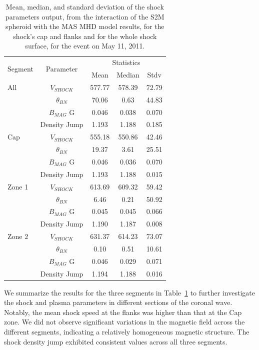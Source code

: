 \begin{table}[!htp] %
	\centering
	\caption{Mean, median, and standard deviation of the shock parameters output, from the interaction of the S2M spheroid with the MAS MHD model results, for the shock's cap and flanks and for the whole shock surface, for the event on May 11, 2011.}
	\label{T_sh_param_110511}
	\begin{tabular}{lcccc}
		\hline
		\multirow{2}{*}{Segment} & \multirow{2}{*}{Parameter} & \multicolumn{3}{c}{Statistics} \\
		&                         & Mean & Median & Stdv \\ \hline
		All & $V_{SHOCK}$ \kms    & 577.77 & 578.39 & 72.79 \\ 
		& $\theta_{BN}$ \degree   & 70.06 & 0.63 & 44.83 \\ 
		& $B_{MAG}$ G             & 0.046 & 0.038 & 0.070 \\ 
		& Density Jump            & 1.193 & 1.188 & 0.185 \\ \hline
		
		Cap & $V_{SHOCK}$ \kms    & 555.18 & 550.86 & 42.46 \\ 
		& $\theta_{BN}$ \degree   & 19.37 & 3.61 & 25.51 \\ 
		& $B_{MAG}$ G             & 0.046 & 0.036 & 0.070 \\ 
		& Density Jump            & 1.193 & 1.188 & 0.015 \\ \hline
		
		Zone 1 & $V_{SHOCK}$ \kms & 613.69 & 609.32 & 59.42 \\ 
		& $\theta_{BN}$ \degree   & 6.46 & 0.21 & 50.92 \\ 
		& $B_{MAG}$ G             & 0.045 & 0.045 & 0.066 \\ 
		& Density Jump            & 1.190 & 1.187 & 0.008 \\ \hline
		
		Zone 2 & $V_{SHOCK}$ \kms & 631.37 & 614.23 & 73.07 \\ 
		& $\theta_{BN}$ \degree   & 0.10 & 0.51 & 10.61 \\ 
		& $B_{MAG}$ G             & 0.046 & 0.029 & 0.071 \\ 
		& Density Jump            & 1.194 & 1.188 & 0.016 \\ \hline
	\end{tabular}
\end{table}

We summarize the results for the three segments in Table~\ref{T_sh_param_110511} to further investigate the shock and plasma parameters in different sections of the coronal wave. Notably, the mean shock speed at the flanks was higher than that at the Cap zone. We did not observe significant variations in the magnetic field across the different segments, indicating a relatively homogeneous magnetic structure. The shock density jump exhibited consistent values across all three segments.

